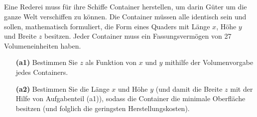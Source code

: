 \subsection*{}
Eine Rederei muss für ihre Schiffe Container herstellen, um darin Güter um die ganze Welt verschiffen zu können. Die Container müssen alle identisch sein und sollen, mathematisch formuliert, die Form eines Quaders  mit Länge $ x $, Höhe $ y $ und Breite $ z $ besitzen. Jeder Container muss ein Fassungsvermögen von 27 Volumeneinheiten haben. 
\begin{enumerate}
	\item[\textbf{(a1)}]
	Bestimmen Sie $ z $ als Funktion von $ x $ und $ y $ mithilfe der Volumenvorgabe jedes Containers.
	\item[\textbf{(a2)}] 
	Bestimmen Sie die Länge $ x $ und Höhe $ y $ (und damit die Breite $ z $ mit der Hilfe von Aufgabenteil (a1)), sodass die Container die minimale Oberfläche besitzen (und folglich die geringsten Herstellungskosten).
\end{enumerate}
\ \\
